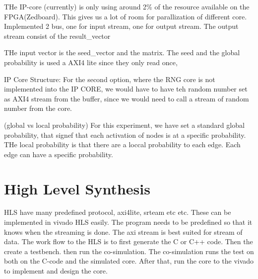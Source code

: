 THe IP-core (currently) is only using around 2\% of the resource available on the FPGA(Zedboard). This gives us a lot of room for parallization of different core. Implemented 2 bus, one for input stream, one for output stream. The output stream consist of the result_vector

THe input vector is the seed_vector and the matrix. The seed and the global probability is used a AXI4 lite since they only read once, 


IP Core Structure:
For the second option, where the RNG core is not implemented into the IP CORE, we would have to have teh random number set as AXI4 stream from the buffer, since we would need to call a stream of random number from the core.


(global vs local probability)
For this experiment, we have set a standard global probability, that signef that each activation of nodes is at a specific probability. THe local probability is that there are a loccal probability to each edge. Each edge can have a specific probability.


\section{High Level Synthesis}
HLS have many predefined protocol, axi4lite, srteam etc etc. These can be implemented in vivado HLS easily. The program needs to be predefined so that it knows when the streaming is done. The axi stream is best suited for stream of data. The work flow to the HLS is to first generate the C or C++ code. Then the create a testbench. then run the co-simulation. The co-simulation runs the test on both on the C-code and the simulated core. After that, run the core to the vivado to implement and design the core. 